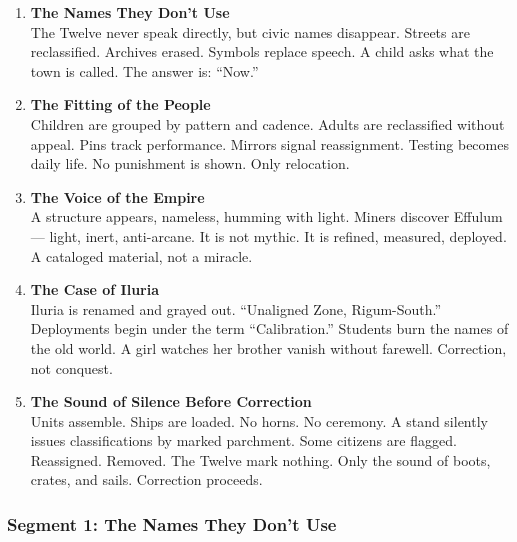\documentclass[9pt]{article}
\begin{document}
\begin{center}
\begin{enumerate}
    \item \textbf{The Names They Don’t Use} \\
    The Twelve never speak directly, but civic names disappear. Streets are reclassified. Archives erased. Symbols replace speech. A child asks what the town is called. The answer is: “Now.”

    \vspace{.3in}
    \item \textbf{The Fitting of the People} \\
    Children are grouped by pattern and cadence. Adults are reclassified without appeal. Pins track performance. Mirrors signal reassignment. Testing becomes daily life. No punishment is shown. Only relocation.

    \vspace{.3in}
    \item \textbf{The Voice of the Empire} \\
     A structure appears, nameless, humming with light. Miners discover Effulum — light, inert, anti-arcane. It is not mythic. It is refined, measured, deployed. A cataloged material, not a miracle.

    \vspace{.3in}
    \item \textbf{The Case of Iluria} \\
    Iluria is renamed and grayed out. “Unaligned Zone, Rigum-South.” Deployments begin under the term “Calibration.” Students burn the names of the old world. A girl watches her brother vanish without farewell. Correction, not conquest.

    \vspace{.3in}
    \item \textbf{The Sound of Silence Before Correction} \\
    Units assemble. Ships are loaded. No horns. No ceremony. A stand silently issues classifications by marked parchment. Some citizens are flagged. Reassigned. Removed. The Twelve mark nothing. Only the sound of boots, crates, and sails. Correction proceeds.
\end{enumerate}
\end{center}


\newpage

\subsubsection*{Segment 1: The Names They Don’t Use}
\end{document}
